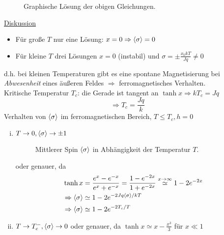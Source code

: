 \begin{enumerate}[A)]
\begin{figure}[H]
        \def\svgwidth{0.7\textwidth}
        
        \caption{Graphische Lösung der obigen Gleichungen.}
        \label{img:SolMFA}
\end{figure}
    \underline{Diskussion}
    \begin{itemize}
        \item Für große $T$ nur eine Lösung: $x = 0 \Rightarrow \left\langle\sigma\right\rangle = 0$
        \item Für kleine $T$ drei Lösungen $x = 0$ (instabil) und $\sigma = \pm \frac{x_0 k T}{J q} \neq 0$
    \end{itemize}
    d.h. bei kleinen Temperaturen gibt es eine spontane Magnetisierung bei \emph{Abwesenheit} eines äußeren Feldes
    $\Rightarrow$ ferromagnetisches Verhalten. \\
    Kritische Temperatur $T_c$: die Gerade ist tangent an $\tanh x \Rightarrow k T_c = J q$
    \begin{equation}
        \Rightarrow T_c = \frac{J q}{k}
    \end{equation}
    Verhalten von $\left\langle\sigma\right\rangle$ im ferromagnetischen Bereich, $T \leq T_c, h = 0$
    \begin{enumerate}[i)]
        \item $T \to 0, \left\langle\sigma\right\rangle \to \pm 1$
        \begin{figure}[H]
        \centering
        \def\svgwidth{0.4\textwidth}
        
        \caption{Mittlerer Spin $\left\langle\sigma\right\rangle$ in Abhängigkeit der Temperatur $T$.}
        \label{img:sigma_T_Diag}
		\end{figure}
        oder genauer, da
        \begin{equation}
            \begin{split}
                \tanh x &= \frac{e^x - e^{-x}}{e^x + e^{-x}} = \frac{1 - e^{-2x}}{1 + e^{-2x}} \overset{x \to \infty}{\simeq} 1 - 2 e^{-2x} \\
                \Rightarrow \left\langle\sigma\right\rangle &\simeq 1 - 2 e^{- 2 J q \left\langle\sigma\right\rangle / k T} \\
                \Rightarrow \left\langle\sigma\right\rangle &\simeq 1 - 2 e^{-2 T_c / T}
            \end{split}
        \end{equation}
        \item $T \to T_c^-, \left\langle\sigma\right\rangle \to 0$
        oder genauer, da $\tanh x \simeq x - \frac{x^3}{3}$ für $x \ll 1$
        \begin{equation}
            \begin{split}

\end{split}
\end{equation}
\end{enumerate}
\end{enumerate}
